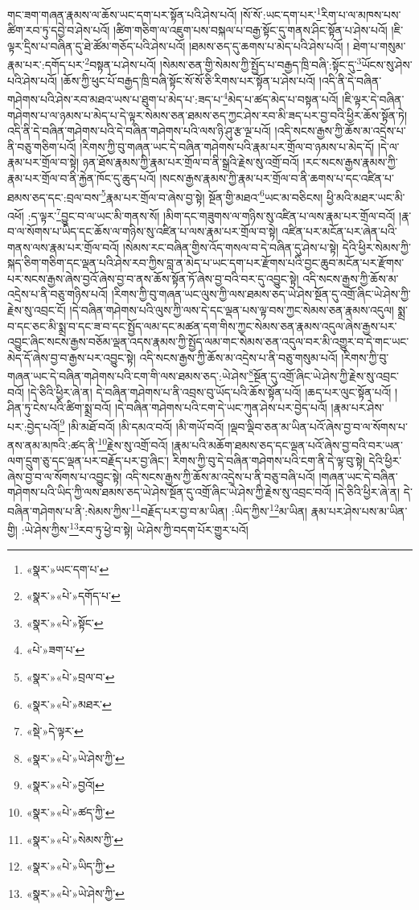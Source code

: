 གང་ཟག་གཞན་རྣམས་ལ་ཆོས་ཡང་དག་པར་སྟོན་པའི་ཤེས་པའོ། །སོ་སོ་:ཡང་དག་པར་\footnote{«སྣར་»ཡང་དག་པ་}རིག་པ་ལ་མཁས་པས་ཚིག་རབ་ཏུ་དབྱེ་བ་ཤེས་པའོ། །ཚིག་གཅིག་ལ་འཇུག་པས་བསྐལ་པ་བརྒྱ་སྟོང་དུ་གནས་ཤིང་སྟོན་པ་ཤེས་པའོ། །ཇི་ལྟར་དྲིས་པ་བཞིན་དུ་ཐེ་ཚོམ་གཅོད་པའི་ཤེས་པའོ། །ཐམས་ཅད་དུ་ཆགས་པ་མེད་པའི་ཤེས་པའོ། །
ཐེག་པ་གསུམ་རྣམ་པར་:དགོད་པར་\footnote{«སྣར་»«པེ་»དགོད་པ་}བསྟན་པ་ཤེས་པའོ། །སེམས་ཅན་གྱི་སེམས་ཀྱི་སྤྱོད་པ་བརྒྱད་ཁྲི་བཞི་:སྟོང་དུ་\footnote{«སྣར་»«པེ་»སྟོང་}ཡོངས་སུ་ཤེས་པའི་ཤེས་པའོ། །ཆོས་ཀྱི་ཕུང་པོ་བརྒྱད་ཁྲི་བཞི་སྟོང་སོ་སོ་ཅི་རིགས་པར་སྟོན་པ་ཤེས་པའོ། །འདི་ནི་དེ་བཞིན་གཤེགས་པའི་ཤེས་རབ་མཐའ་ཡས་པ་ཐུག་པ་མེད་པ་:ཟད་པ་\footnote{«པེ་»ཟག་པ་}མེད་པ་ཚད་མེད་པ་བསྟན་པའོ། །ཇི་ལྟར་དེ་བཞིན་གཤེགས་པ་ལ་ཉམས་པ་མེད་པ་དེ་ལྟར་སེམས་ཅན་ཐམས་ཅད་ཀྱང་ཤེས་རབ་མི་ཟད་པར་བྱ་བའི་ཕྱིར་ཆོས་སྟོན་ཏེ། འདི་ནི་དེ་བཞིན་གཤེགས་པའི་དེ་བཞིན་གཤེགས་པའི་ལས་ཉི་ཤུ་རྩ་ལྔ་པའོ། །འདི་སངས་རྒྱས་ཀྱི་ཆོས་མ་འདྲེས་པ་ནི་བཅུ་གཅིག་པའོ། །རིགས་ཀྱི་བུ་གཞན་ཡང་དེ་བཞིན་གཤེགས་པའི་རྣམ་པར་གྲོལ་བ་ཉམས་པ་མེད་དོ། །དེ་ལ་རྣམ་པར་གྲོལ་བ་སྟེ། ཉན་ཐོས་རྣམས་ཀྱི་རྣམ་པར་གྲོལ་བ་ནི་སྒྲའི་རྗེས་སུ་འགྲོ་བའོ། །རང་སངས་རྒྱས་རྣམས་ཀྱི་རྣམ་པར་གྲོལ་བ་ནི་རྐྱེན་ཁོང་དུ་ཆུད་པའོ། །སངས་རྒྱས་རྣམས་ཀྱི་རྣམ་པར་གྲོལ་བ་ནི་ཆགས་པ་དང་འཛིན་པ་ཐམས་ཅད་དང་:བྲལ་བས་\footnote{«སྣར་»«པེ་»བྲལ་བ་}རྣམ་པར་གྲོལ་བ་ཞེས་བྱ་སྟེ། སྔོན་གྱི་མཐའ་\footnote{«སྣར་»«པེ་»མཐར་}ཡང་མ་བཅིངས། ཕྱི་མའི་མཐར་ཡང་མི་འཕོ། :ད་ལྟར་\footnote{«སྡེ་»དེ་ལྟར་}བྱུང་བ་ལ་ཡང་མི་གནས་སོ། །མིག་དང་གཟུགས་ལ་གཉིས་སུ་འཛིན་པ་ལས་རྣམ་པར་གྲོལ་བའོ། །རྣ་བ་ལ་སོགས་པ་ཡིད་དང་ཆོས་ལ་གཉིས་སུ་འཛིན་པ་ལས་རྣམ་པར་གྲོལ་བ་སྟེ། འཛིན་པར་མངོན་པར་ཞེན་པའི་གནས་ལས་རྣམ་པར་གྲོལ་བའོ། །སེམས་རང་བཞིན་གྱིས་འོད་གསལ་བ་དེ་བཞིན་དུ་ཤེས་པ་སྟེ། དེའི་ཕྱིར་སེམས་ཀྱི་སྐད་ཅིག་གཅིག་དང་ལྡན་པའི་ཤེས་རབ་ཀྱིས་བླ་ན་མེད་པ་ཡང་དག་པར་རྫོགས་པའི་བྱང་ཆུབ་མངོན་པར་རྫོགས་པར་སངས་རྒྱས་ཞེས་བྱའོ་ཞེས་བྱ་བ་ནས་ཆོས་སྟོན་ཏོ་ཞེས་བྱ་བའི་བར་དུ་འབྱུང་སྟེ། འདི་སངས་རྒྱས་ཀྱི་ཆོས་མ་འདྲེས་པ་ནི་བཅུ་གཉིས་པའོ། །རིགས་ཀྱི་བུ་གཞན་ཡང་ལུས་ཀྱི་ལས་ཐམས་ཅད་ཡེ་ཤེས་སྔོན་དུ་འགྲོ་ཞིང་ཡེ་ཤེས་ཀྱི་རྗེས་སུ་འབྲང་ངོ། །དེ་བཞིན་གཤེགས་པའི་ལུས་ཀྱི་ལས་དེ་དང་ལྡན་པས་ལྟ་བས་ཀྱང་སེམས་ཅན་རྣམས་འདུལ། སྨྲ་བ་དང་ཅང་མི་སྨྲ་བ་དང་ཟ་བ་དང་སྤྱོད་ལམ་དང་མཚན་དག་གིས་ཀྱང་སེམས་ཅན་རྣམས་འདུལ་ཞེས་རྒྱས་པར་འབྱུང་ཞིང་སངས་རྒྱས་བཅོམ་ལྡན་འདས་རྣམས་ཀྱི་སྤྱོད་ལམ་གང་སེམས་ཅན་འདུལ་བར་མི་འགྱུར་བ་དེ་གང་ཡང་མེད་དོ་ཞེས་བྱ་བ་རྒྱས་པར་འབྱུང་སྟེ། འདི་སངས་རྒྱས་ཀྱི་ཆོས་མ་འདྲེས་པ་ནི་བཅུ་གསུམ་པའོ། །རིགས་ཀྱི་བུ་གཞན་ཡང་དེ་བཞིན་གཤེགས་པའི་ངག་གི་ལས་ཐམས་ཅད་:ཡེ་ཤེས་\footnote{«སྣར་»«པེ་»ཡེ་ཤེས་ཀྱི་}སྔོན་དུ་འགྲོ་ཞིང་ཡེ་ཤེས་ཀྱི་རྗེས་སུ་འབྲང་བའོ། །དེ་ཅིའི་ཕྱིར་ཞེ་ན། དེ་བཞིན་གཤེགས་པ་ནི་འབྲས་བུ་ཡོད་པའི་ཆོས་སྟོན་པའོ། །ཆད་པར་ལུང་སྟོན་པའོ། །ཤིན་ཏུ་ངེས་པའི་ཚིག་སྨྲ་བའོ། །དེ་བཞིན་གཤེགས་པའི་ངག་དེ་ཡང་ཀུན་ཤེས་པར་བྱེད་པའོ། །རྣམ་པར་ཤེས་པར་:བྱེད་པའོ།\footnote{«སྣར་»«པེ་»བྱའོ།} །མི་མཐོ་བའོ། །མི་དམའ་བའོ། །མི་གཡོ་བའོ། །ལྡབ་ལྡིབ་ཅན་མ་ཡིན་པའོ་ཞེས་བྱ་བ་ལ་སོགས་པ་ནས་ནམ་མཁའི་:ཚད་ནི་\footnote{«སྣར་»«པེ་»ཚད་ཀྱི་}རྗེས་སུ་འགྲོ་བའོ། །རྣམ་པའི་མཆོག་ཐམས་ཅད་དང་ལྡན་པའོ་ཞེས་བྱ་བའི་བར་ཡན་ལག་དྲུག་ཅུ་དང་ལྡན་པར་བརྗོད་པར་བྱ་ཞིང་། རིགས་ཀྱི་བུ་དེ་བཞིན་གཤེགས་པའི་ངག་ནི་དེ་ལྟ་བུ་སྟེ། དེའི་ཕྱིར་ཞེས་བྱ་བ་ལ་སོགས་པ་འབྱུང་སྟེ། འདི་སངས་རྒྱས་ཀྱི་ཆོས་མ་འདྲེས་པ་ནི་བཅུ་བཞི་པའོ། །གཞན་ཡང་དེ་བཞིན་གཤེགས་པའི་ཡིད་ཀྱི་ལས་ཐམས་ཅད་ཡེ་ཤེས་སྔོན་དུ་འགྲོ་ཞིང་ཡེ་ཤེས་ཀྱི་རྗེས་སུ་འབྲང་བའོ། །དེ་ཅིའི་ཕྱིར་ཞེ་ན། དེ་བཞིན་གཤེགས་པ་ནི་:སེམས་ཀྱིས་\footnote{«སྣར་»«པེ་»སེམས་ཀྱི་}བརྗོད་པར་བྱ་བ་མ་ཡིན། :ཡིད་ཀྱིས་\footnote{«སྣར་»«པེ་»ཡིད་ཀྱི་}མ་ཡིན། རྣམ་པར་ཤེས་པས་མ་ཡིན་གྱི། :ཡེ་ཤེས་ཀྱིས་\footnote{«སྣར་»«པེ་»ཡེ་ཤེས་ཀྱི་}རབ་ཏུ་ཕྱེ་བ་སྟེ། ཡེ་ཤེས་ཀྱི་བདག་པོར་གྱུར་པའོ། 